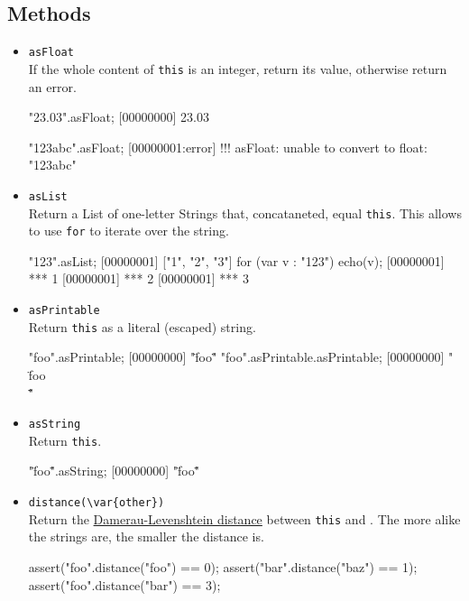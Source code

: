 \subsection{Methods}
\begin{itemize}
\item \lstinline|asFloat|\\
  If the whole content of \lstinline|this| is an integer, return its
  value, otherwise return an error.
\begin{urbiscript}
"23.03".asFloat;
[00000000] 23.03

"123abc".asFloat;
[00000001:error] !!! asFloat: unable to convert to float: "123abc"
\end{urbiscript}

\item \lstinline|asList|\\
  Return a List of one-letter Strings that, concataneted, equal
  \lstinline|this|.  This allows to use \lstinline|for| to iterate
  over the string.
\begin{urbiscript}
"123".asList;
[00000001] ["1", "2", "3"]
for (var v : "123")
  echo(v);
[00000001] *** 1
[00000001] *** 2
[00000001] *** 3
\end{urbiscript}

\item \lstinline|asPrintable|\\
  Return \lstinline|this| as a literal (escaped) string.
\begin{urbiscript}
"foo".asPrintable;
[00000000] "\"foo\""
"foo".asPrintable.asPrintable;
[00000000] "\"\\\"foo\\\"\""
\end{urbiscript}

\item \lstinline|asString|\\
  Return \lstinline|this|.
\begin{urbiscript}
"\"foo\"".asString;
[00000000] "\"foo\""
\end{urbiscript}

\item \lstinline|distance(\var{other})|\\
  Return the
  \href{http://en.wikipedia.org/wiki/Damerau-Levenshtein_distance}
  {Damerau-Levenshtein distance} between \lstinline|this| and
  .  The more alike the strings are, the smaller the
  distance is.
\begin{urbiscript}
assert("foo".distance("foo") == 0);
assert("bar".distance("baz") == 1);
assert("foo".distance("bar") == 3);
\end{urbiscript}


\end{itemize}
